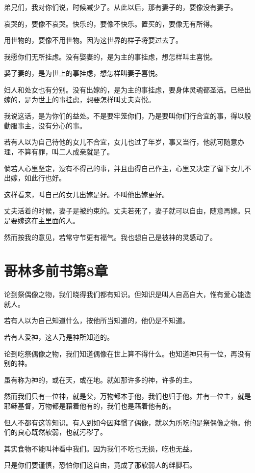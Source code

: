 \documentclass[12pt,oneside]{book}
\begin{document}
弟兄们，我对你们说，时候减少了。从此以后，那有妻子的，要像没有妻子。

哀哭的，要像不哀哭。快乐的，要像不快乐。置买的，要像无有所得。

用世物的，要像不用世物。因为这世界的样子将要过去了。

我愿你们无所挂虑。没有娶妻的，是为主的事挂虑，想怎样叫主喜悦。

娶了妻的，是为世上的事挂虑，想怎样叫妻子喜悦。

妇人和处女也有分别。没有出嫁的，是为主的事挂虑，要身体灵魂都圣洁。已经出嫁的，是为世上的事挂虑，想要怎样叫丈夫喜悦。

我说这话，是为你们的益处。不是要牢笼你们，乃是要叫你们行合宜的事，得以殷勤服事主，没有分心的事。

若有人以为自己待他的女儿不合宜，女儿也过了年岁，事又当行，他就可随意办理，不算有罪，叫二人成亲就是了。

倘若人心里坚定，没有不得己的事，并且由得自己作主，心里又决定了留下女儿不出嫁，如此行也好。

这样看来，叫自己的女儿出嫁是好。不叫他出嫁更好。

丈夫活着的时候，妻子是被约束的。丈夫若死了，妻子就可以自由，随意再嫁。只是要嫁这在主里面的人。

然而按我的意见，若常守节更有福气。我也想自己是被神的灵感动了。

\chapter{哥林多前书第8章}
论到祭偶像之物，我们晓得我们都有知识。但知识是叫人自高自大，惟有爱心能造就人。

若有人以为自己知道什么，按他所当知道的，他仍是不知道。

若有人爱神，这人乃是神所知道的。

论到吃祭偶像之物，我们知道偶像在世上算不得什么。也知道神只有一位，再没有别的神。

虽有称为神的，或在天，或在地。就如那许多的神，许多的主。

然而我们只有一位神，就是父，万物都本于他，我们也归于他。并有一位主，就是耶稣基督，万物都是藉着他有的，我们也是藉着他有的。

但人不都有这等知识。有人到如今因拜惯了偶像，就以为所吃的是祭偶像之物。他们的良心既然软弱，也就污秽了。

其实食物不能叫神看中我们。因为我们不吃也无损，吃也无益。

只是你们要谨慎，恐怕你们这自由，竟成了那软弱人的绊脚石。
\end{document}

